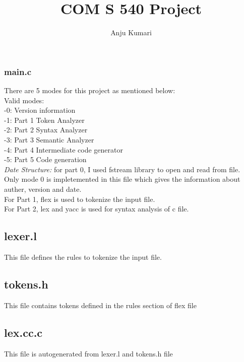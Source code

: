 \documentclass{article}
\title{COM S 540 Project }
\author{Anju Kumari}
\date{}
\begin{document}
   

\maketitle
\section*{}

\subsubsection*{main.c}
There are 5 modes for this project as mentioned below: \\
Valid modes: \\
-0: Version information \\
-1: Part 1 Token Analyzer \\
-2: Part 2 Syntax Analyzer\\
-3: Part 3 Semantic Analyzer \\
-4: Part 4 Intermediate code generator \\
-5: Part 5 Code generation\\

{\it Date Structure:} for part 0, I used fstream library to open and read from file. \\
Only mode 0 is impletemented in this file which gives the information about auther, version and date. \\
For Part 1, flex is used to tokenize the input file. \\
For Part 2, lex and yacc is used for syntax analysis of c file. \\

\subsection*{lexer.l}
This file defines the rules to tokenize the input file.

\subsection*{tokens.h}
This file contains tokens defined in the rules section of flex file\\

\subsection*{lex.cc.c}
This file is autogenerated from lexer.l and tokens.h file \\
\end{document}
